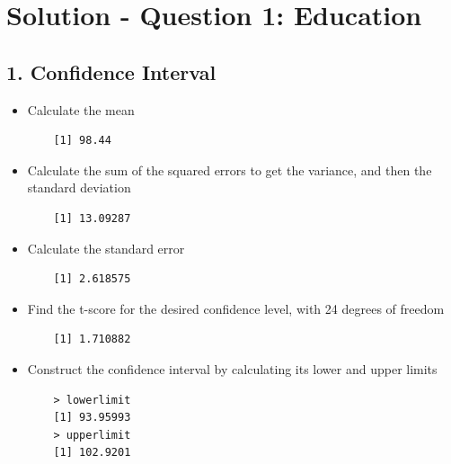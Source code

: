 \documentclass[12pt,letterpaper]{article}
\begin{document}
\newpage
	\section*{Solution - Question 1: Education}
\vspace{.5cm}
\subsection*{1. Confidence Interval}
\begin{itemize}
	\item 
	Calculate the mean 
	 
  \begin{verbatim}
  	[1] 98.44
  \end{verbatim}
  \item 
  Calculate the sum of the squared errors to get the variance, and then the standard deviation
  	 
  \begin{verbatim}
  	[1] 13.09287
  \end{verbatim}
  \item 
  Calculate the standard error 
   
  \begin{verbatim}
  	[1] 2.618575
  \end{verbatim}
   \item 
  Find the t-score for the desired confidence level, with 24 degrees of freedom
   
  \begin{verbatim}
  	[1] 1.710882
  \end{verbatim}
   \item 
  Construct the confidence interval by calculating its lower and upper limits
   
  \begin{verbatim}
  	> lowerlimit
  	[1] 93.95993
  	> upperlimit
  	[1] 102.9201
  \end{verbatim}
  \end{itemize}
\newpage 
\end{document}
